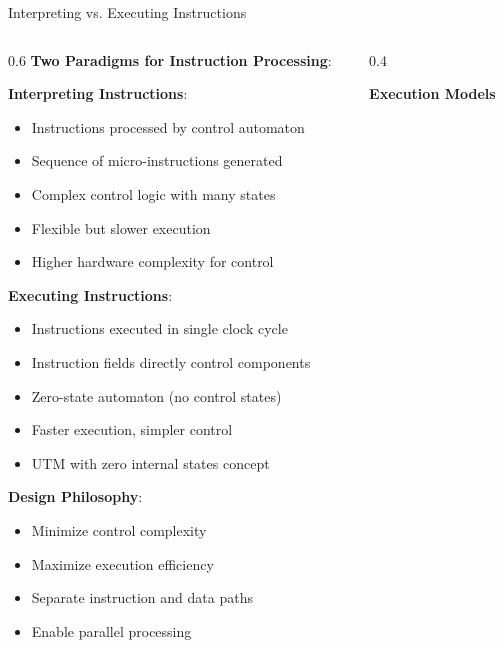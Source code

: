 \documentclass[aspectratio=169]{beamer}
\newcommand{\concept}[1]{\textbf{\color{darkblue}#1}}
\begin{document}
\begin{frame}{Interpreting vs. Executing Instructions}
\begin{columns}
\begin{column}{0.6\textwidth}
\concept{Two Paradigms for Instruction Processing}:

\vspace{0.3cm}
\concept{Interpreting Instructions}:
\begin{itemize}
\item Instructions processed by control automaton
\item Sequence of micro-instructions generated
\item Complex control logic with many states
\item Flexible but slower execution
\item Higher hardware complexity for control
\end{itemize}

\vspace{0.3cm}
\concept{Executing Instructions}:
\begin{itemize}
\item Instructions executed in single clock cycle
\item Instruction fields directly control components
\item Zero-state automaton (no control states)
\item Faster execution, simpler control
\item UTM with zero internal states concept
\end{itemize}

\vspace{0.3cm}
\concept{Design Philosophy}:
\begin{itemize}
\item Minimize control complexity
\item Maximize execution efficiency
\item Separate instruction and data paths
\item Enable parallel processing
\end{itemize}
\end{column}
\begin{column}{0.4\textwidth}
\begin{center}
\textbf{Execution Models}
\vspace{0.3cm}

\end{center}
\end{column}
\end{columns}
\end{frame}
\end{document}
